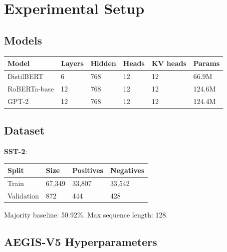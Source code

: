 \section{Experimental Setup}

\subsection{Models}

\begin{table}[H]
\centering
\small
\begin{tabular}{llllll}
\toprule
\textbf{Model} & \textbf{Layers} & \textbf{Hidden} & \textbf{Heads} & \textbf{KV heads} & \textbf{Params} \\
\midrule
DistilBERT & 6 & 768 & 12 & 12 & 66.9M \\
RoBERTa-base & 12 & 768 & 12 & 12 & 124.6M \\
GPT-2 & 12 & 768 & 12 & 12 & 124.4M \\
\bottomrule
\end{tabular}
\end{table}

\subsection{Dataset}

\textbf{SST-2}:

\begin{table}[H]
\centering
\small
\begin{tabular}{llll}
\toprule
\textbf{Split} & \textbf{Size} & \textbf{Positives} & \textbf{Negatives} \\
\midrule
Train & 67,349 & 33,807 & 33,542 \\
Validation & 872 & 444 & 428 \\
\bottomrule
\end{tabular}
\end{table}

Majority baseline: 50.92\%. Max sequence length: 128.

\subsection{AEGIS-V5 Hyperparameters}

